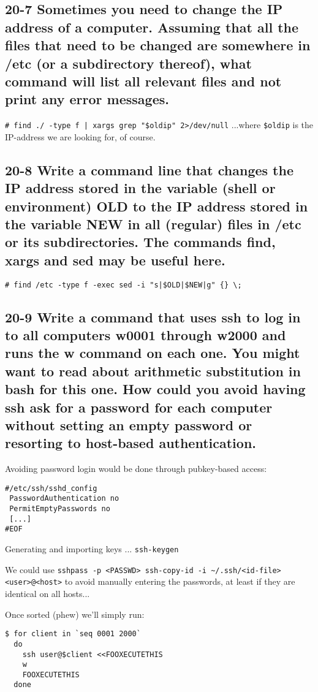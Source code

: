 \subsection{20-7 Sometimes you need to change the IP address of a computer. Assuming that all the files that need to be changed are somewhere in /etc (or a subdirectory thereof), what command will list all relevant files and not print any error messages.}
\verb=# find ./ -type f | xargs grep "$oldip" 2>/dev/null=
...where \verb=$oldip= is the IP-address we are looking for, of course.

\subsection{20-8 Write a command line that changes the IP address stored in the variable (shell or environment) OLD to the IP address stored in the variable NEW in all (regular) files in /etc or its subdirectories. The commands find, xargs and sed may be useful here.}
\verb=# find /etc -type f -exec sed -i "s|$OLD|$NEW|g" {} \;=

\subsection{20-9 Write a command that uses ssh to log in to all computers w0001 through w2000 and runs the w command on each one. You might want to read about arithmetic substitution in bash for this one. How could you avoid having ssh ask for a password for each computer without setting an empty password or resorting to host-based authentication.}

Avoiding password login would be done through pubkey-based access:

\begin{verbatim}
#/etc/ssh/sshd_config
 PasswordAuthentication no
 PermitEmptyPasswords no
 [...]
#EOF
\end{verbatim}

Generating and importing keys ...
\verb=ssh-keygen=

We could use \verb=sshpass -p <PASSWD> ssh-copy-id -i ~/.ssh/<id-file> <user>@<host>= to avoid manually entering the passwords, at least if they are identical on all hosts...

Once sorted (phew) we'll simply run:

\begin{verbatim}
$ for client in `seq 0001 2000`
  do
    ssh user@$client <<FOOXECUTETHIS
    w
    FOOXECUTETHIS
  done
\end{verbatim}
